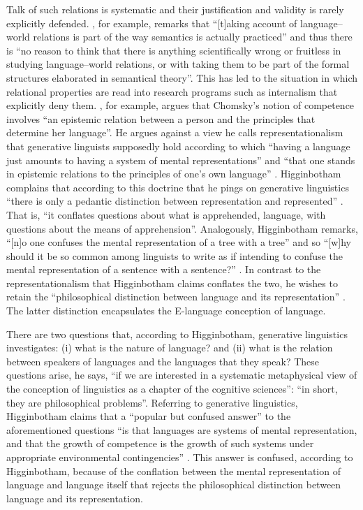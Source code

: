 Talk of such relations is systematic and their justification and validity is rarely explicitly defended. \citet[466]{Burge2003}, for example, remarks that “[t]aking account of language–world relations is part of the way semantics is actually practiced” and thus there is “no reason to think that there is anything scientifically wrong or fruitless in studying language–world relations, or with taking them to be part of the formal structures elaborated in semantical theory”. This has led to the situation in which relational properties are read into research programs such as internalism that explicitly deny them. \citet[556]{Higginbotham1991}, for example, argues that Chomsky’s notion of competence involves “an epistemic relation between a person and the principles that determine her language”. He argues against a view he calls representationalism that generative linguists supposedly hold according to which “having a language just amounts to having a system of mental representations” and “that one stands in epistemic relations to the principles of one’s own language” \citep[557]{Higginbotham1991}. Higginbotham complains that according to this doctrine that he pings on generative linguistics “there is only a pedantic distinction between representation and represented” \citep[557]{Higginbotham1991}. That is, “it conflates questions about what is apprehended, language, with questions about the means of apprehension”. Analogously,  Higginbotham remarks, “[n]o one confuses the mental representation of a tree with a tree” and so “[w]hy should it be so common among linguists to write as if intending to confuse the mental representation of a sentence with a sentence?” \citep[555]{Higginbotham1991}. In contrast to the representationalism that Higginbotham claims conflates the two, he wishes to retain the “philosophical distinction between language and its representation” \citep[558]{Higginbotham1991}. The latter distinction encapsulates the E-language conception of language. 

There are two questions that, according to Higginbotham, generative linguistics investigates: (i) what is the nature of language? and (ii) what is the relation between speakers of languages and the languages that they speak? These questions arise, he says, “if we are interested in a systematic metaphysical view of the conception of linguistics as a chapter of the cognitive sciences”: “in short, they are philosophical problems”. Referring to generative linguistics, Higginbotham claims that a “popular but confused answer” to the aforementioned questions “is that languages are systems of mental representation, and that the growth of competence is the growth of such systems under appropriate environmental contingencies” \citep[555]{Higginbotham1991}. This answer is confused, according to Higginbotham, because of the conflation between the mental representation of language and language itself that rejects the philosophical distinction between language and its representation.

